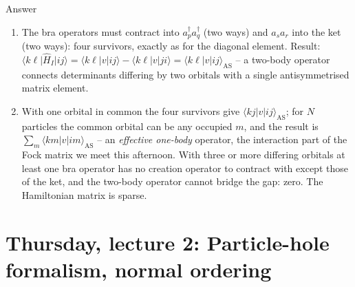 \documentclass[aspectratio=169,10pt]{beamer}
\newcounter{thinkctr}
\newcommand{\thinka}[1]{%
  \begin{tcolorbox}[colback=paleteal,colframe=teal,title={\bfseries Answer to pause \#\thethinkctr}]
  #1
  \end{tcolorbox}}
\newcommand{\element}[3]{\langle #1\vert #2\vert #3\rangle}
\begin{document}
\begin{frame}{Answer}
  \thinka{
  \begin{enumerate}
    \item The bra operators must contract into $a_p^{\dagger}a_q^{\dagger}$ (two ways) and $a_sa_r$ into the ket (two ways): four survivors, exactly as for the diagonal element. Result: $\element{k\ell}{\hat{H}_I}{ij}=\element{k\ell}{v}{ij}-\element{k\ell}{v}{ji}=\element{k\ell}{v}{ij}_{\mathrm{AS}}$ -- a two-body operator connects determinants differing by two orbitals with a single antisymmetrised matrix element.
    \item With one orbital in common the four survivors give $\element{kj}{v}{ij}_{\mathrm{AS}}$; for $N$ particles the common orbital can be any occupied $m$, and the result is $\sum_m\element{km}{v}{im}_{\mathrm{AS}}$ -- an \emph{effective one-body} operator, the interaction part of the Fock matrix we meet this afternoon. With three or more differing orbitals at least one bra operator has no creation operator to contract with except those of the ket, and the two-body operator cannot bridge the gap: \alert{zero}. The Hamiltonian matrix is sparse.
  \end{enumerate}}
\end{frame}

\section{Thursday, lecture 2: Particle-hole formalism, normal ordering}
\end{document}
